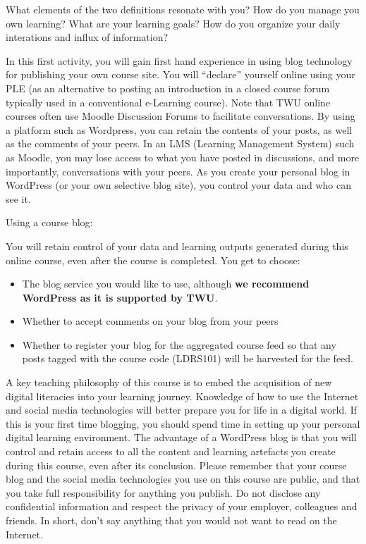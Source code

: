 \documentclass[
]{book}
\providecommand{\tightlist}{%
  \setlength{\itemsep}{0pt}\setlength{\parskip}{0pt}}
\theoremstyle{definition}
\theoremstyle{definition}
\theoremstyle{definition}
\theoremstyle{definition}
\theoremstyle{remark}
\begin{document}
What elements of the two definitions resonate with you? How do you manage you own learning? What are your learning goals? How do you organize your daily interations and influx of information?

In this first activity, you will gain first hand experience in using blog technology for publishing your own course site. You will ``declare'' yourself online using your PLE (as an alternative to posting an introduction in a closed course forum typically used in a conventional e-Learning course). Note that TWU online courses often use Moodle Discussion Forums to facilitate conversations. By using a platform such as Wordpress, you can retain the contents of your posts, as well as the comments of your peers. In an LMS (Learning Management System) such as Moodle, you may lose access to what you have posted in discussions, and more importantly, conversations with your peers. As you create your personal blog in WordPress (or your own selective blog site), you control your data and who can see it.

Using a course blog:

You will retain control of your data and learning outputs generated during this online course, even after the course is completed.
You get to choose:

\begin{itemize}
\tightlist
\item
  The blog service you would like to use, although \textbf{we recommend WordPress as it is supported by TWU}.
\item
  Whether to accept comments on your blog from your peers
\item
  Whether to register your blog for the aggregated course feed so that any posts tagged with the course code (LDRS101) will be harvested for the feed.
\end{itemize}

A key teaching philosophy of this course is to embed the acquisition of new digital literacies into your learning journey. Knowledge of how to use the Internet and social media technologies will better prepare you for life in a digital world. If this is your first time blogging, you should spend time in setting up your personal digital learning environment. The advantage of a WordPress blog is that you will control and retain access to all the content and learning artefacts you create during this course, even after its conclusion. Please remember that your course blog and the social media technologies you use on this course are public, and that you take full responsibility for anything you publish. Do not disclose any confidential information and respect the privacy of your employer, colleagues and friends. In short, don't say anything that you would not want to read on the Internet.
\end{document}
